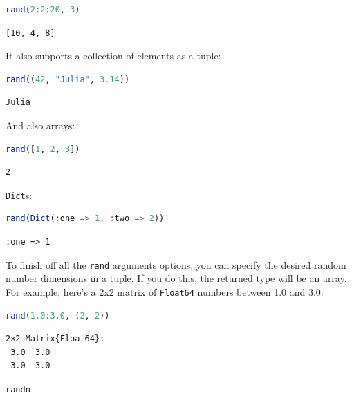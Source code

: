 \documentclass[
  notoc %
]{tufte-book}
\makeatletter
\newcommand{\passthrough}[1]{#1}
\renewcommand\subsubsection{%
\@startsection{subsubsection}{3}{\z@ }{-3.25ex\@plus -1ex \@minus -.2ex}{1.5ex \@plus .2ex}{\normalfont \normalsize \bfseries }
}
\makeatother
\begin{document}
\begin{lstlisting}[language=Julia]
rand(2:2:20, 3)
\end{lstlisting}

\begin{lstlisting}[language=Output]
[10, 4, 8]
\end{lstlisting}

It also supports a collection of elements as a tuple:

\begin{lstlisting}[language=Julia]
rand((42, "Julia", 3.14))
\end{lstlisting}

\begin{lstlisting}[language=Output]
Julia
\end{lstlisting}

And also arrays:

\begin{lstlisting}[language=Julia]
rand([1, 2, 3])
\end{lstlisting}

\begin{lstlisting}[language=Output]
2
\end{lstlisting}

\passthrough{\lstinline!Dict!}s:

\begin{lstlisting}[language=Julia]
rand(Dict(:one => 1, :two => 2))
\end{lstlisting}

\begin{lstlisting}[language=Output]
:one => 1
\end{lstlisting}

To finish off all the \passthrough{\lstinline!rand!} arguments options,
you can specify the desired random number dimensions in a tuple. If you
do this, the returned type will be an array. For example, here's a 2x2
matrix of \passthrough{\lstinline!Float64!} numbers between 1.0 and 3.0:

\begin{lstlisting}[language=Julia]
rand(1.0:3.0, (2, 2))
\end{lstlisting}

\begin{lstlisting}[language=Output]
2×2 Matrix{Float64}:
 3.0  3.0
 3.0  3.0
\end{lstlisting}

\hypertarget{sec:random_randn}{%
\subsubsection{\texorpdfstring{\texttt{randn}}{randn}}\label{sec:random_randn}}
\end{document}
